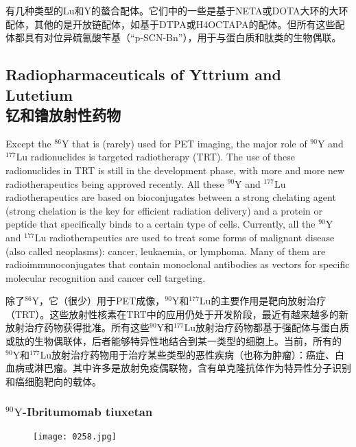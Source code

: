\documentclass[dvipsnames, svgnames,a4paper,11pt]{article}
\begin{document}
有几种类型的Lu和Y的螯合配体。它们中的一些是基于NETA或DOTA大环的大环配体，其他的是开放链配体，如基于DTPA或H4OCTAPA的配体。但所有这些配体都具有对位异硫氰酸苄基（“p-SCN-Bn”），用于与蛋白质和肽类的生物偶联。



\subsection{Radiopharmaceuticals of Yttrium and Lutetium\\ 钇和镥放射性药物}

Except the \(\mathrm{^{86}Y}\) that is (rarely) used for PET imaging, the major role of \(\mathrm{^{90}Y}\) and \(\mathrm{^{177}Lu}\) radionuclides is targeted radiotherapy (TRT). The use of these radionuclides in TRT is still in the development phase, with more and more new radiotherapeutics being approved recently. All these \(\mathrm{^{90}Y}\) and \(\mathrm{^{177}Lu}\) radiotherapeutics are based on bioconjugates between a strong chelating agent (strong chelation is the key for efficient radiation delivery) and a protein or peptide that specifically binds to a certain type of cells. Currently, all the \(\mathrm{^{90}Y}\) and \(\mathrm{^{177}Lu}\) radiotherapeutics are used to treat some forms of malignant disease (also called neoplasms): cancer, leukaemia, or lymphoma. Many of them are radioimmunoconjugates that contain monoclonal antibodies as vectors for specific molecular recognition and cancer cell targeting.

除了\(\mathrm{^{86}Y}\)，它（很少）用于PET成像，\(\mathrm{^{90}Y}\)和\(\mathrm{^{177}Lu}\)的主要作用是靶向放射治疗（TRT）。这些放射性核素在TRT中的应用仍处于开发阶段，最近有越来越多的新放射治疗药物获得批准。所有这些\(\mathrm{^{90}Y}\)和\(\mathrm{^{177}Lu}\)放射治疗药物都基于强配体与蛋白质或肽的生物偶联体，后者能够特异性地结合到某一类型的细胞上。当前，所有的\(\mathrm{^{90}Y}\)和\(\mathrm{^{177}Lu}\)放射治疗药物用于治疗某些类型的恶性疾病（也称为肿瘤）：癌症、白血病或淋巴瘤。其中许多是放射免疫偶联物，含有单克隆抗体作为特异性分子识别和癌细胞靶向的载体。

\subsubsection{\(\mathrm{^{90}Y}\)-Ibritumomab tiuxetan}

\begin{figure}[h]
    \centering
    \texttt{[image: 0258.jpg]}
     \label{fig347}
\end{figure}
\end{document}

